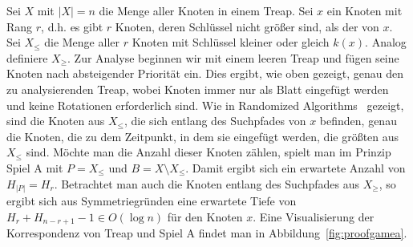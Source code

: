 \documentclass[a4paper]{scrreprt}
\theoremstyle{definition}
\begin{document}
Sei $X$ mit $\left|X\right| = n$ die Menge aller Knoten in einem Treap.
Sei $x$ ein Knoten mit Rang $r$, d.h. es gibt $r$ Knoten, deren Schlüssel nicht größer sind, als der von $x$.
Sei $X_\leq$ die Menge aller $r$ Knoten mit Schlüssel kleiner oder gleich $k(x)$.
Analog definiere $X_\geq$.
Zur Analyse beginnen wir mit einem leeren Treap und fügen seine Knoten nach absteigender Priorität ein.
Dies ergibt, wie oben gezeigt, genau den zu analysierenden Treap, wobei Knoten immer nur als Blatt eingefügt werden und keine Rotationen erforderlich sind.
Wie in Randomized Algorithms~\cite{RandAlg} gezeigt, sind die Knoten aus $X_\leq$, die sich entlang des Suchpfades von $x$ befinden, genau die Knoten, die zu dem Zeitpunkt, in dem sie eingefügt werden, die größten aus $X_\leq$ sind.
Möchte man die Anzahl dieser Knoten zählen, spielt man im Prinzip Spiel A mit $P = X_\leq$ und $B = X \setminus X_\leq$.
Damit ergibt sich ein erwartete Anzahl von $H_{\left|P\right|} = H_r$.
Betrachtet man auch die Knoten entlang des Suchpfades aus $X_\geq$, so ergibt sich aus Symmetriegründen eine erwartete Tiefe von $H_r + H_{n-r+1} - 1 \in O(\log n)$ für den Knoten $x$.
Eine Visualisierung der Korrespondenz von Treap und Spiel A findet man in Abbildung~\ref{fig:proofgamea}.
\end{document}

